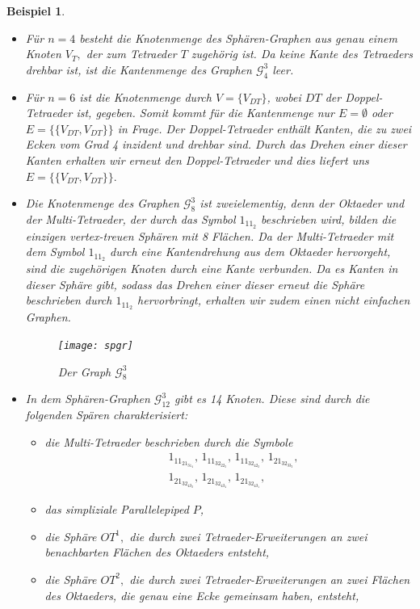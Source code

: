 \documentclass[12pt,titlepage,twoside,cleardoublepage]{article}
\theoremstyle{nummermitklammern}
\newtheorem{bsp}[temp]{Beispiel}
\newtheorem{bsp}[zahl]{Beispiel}
\numberwithin{equation}{section}
\begin{document}
 \begin{bsp}
 \begin{itemize}
 \item Für $n=4$ besteht die Knotenmenge des Sphären-Graphen aus genau einem Knoten $V_T,$ der zum Tetraeder $T$ zugehörig ist. Da keine Kante des Tetraeders drehbar ist, ist die Kantenmenge des Graphen $\mathcal{G}_4^3$ leer. 
 \item Für $n=6$ ist die Knotenmenge durch $V=\{V_{DT}\}$, wobei $DT$ der Doppel-Tetraeder ist, gegeben. Somit kommt für die Kantenmenge nur $E=\emptyset$ oder $E=\{\{V_{DT},V_{DT}\}\}$ in Frage. Der Doppel-Tetraeder enthält Kanten, die zu zwei Ecken vom Grad 4 inzident und drehbar sind. Durch das Drehen einer dieser Kanten erhalten wir erneut den Doppel-Tetraeder und dies liefert uns $E=\{\{V_{DT},V_{DT}\}\}.$ 
 \item Die Knotenmenge des Graphen $\mathcal{G}^3_8$ ist zweielementig, denn  der Oktaeder und der Multi-Tetraeder, der durch das Symbol $1_11_2$ beschrieben wird, bilden die einzigen vertex-treuen Sphären mit 8 Flächen.
 Da der Multi-Tetraeder mit dem Symbol $1_11_2$ durch eine Kantendrehung aus dem Oktaeder hervorgeht, sind die zugehörigen Knoten durch eine Kante verbunden. Da es Kanten in dieser Sphäre gibt, sodass das Drehen einer dieser erneut die Sphäre beschrieben durch $1_11_2$ hervorbringt, erhalten wir zudem einen nicht einfachen Graphen.
 \begin{figure}[H]
\begin{center}
\texttt{[image: spgr]}
\end{center}
\caption{Der Graph $\mathcal{G}_8^3$}
\end{figure}
 \item In dem Sphären-Graphen $\mathcal{G}_{12}^3$ gibt es 14 Knoten. Diese sind durch die folgenden Spären charakterisiert: 
 \begin{itemize}
 \item die Multi-Tetraeder beschrieben durch die Symbole \begin{align*}
&1_11_21_31_4,\,1_11_32_22_3,\,1_11_32_42_2,\,1_21_32_33_2,\\
&1_21_32_43_2,\,1_21_32_43_4,\,1_21_32_43_1,
\end{align*}
\item das simpliziale Parallelepiped $P$,
 \item die Sphäre $OT^1,$ die durch zwei Tetraeder-Erweiterungen an zwei benachbarten Flächen des Oktaeders entsteht,
 \item die Sphäre $OT^2,$ die durch zwei Tetraeder-Erweiterungen an zwei Flächen des Oktaeders, die genau eine Ecke gemeinsam haben, entsteht,

\end{itemize}
\end{itemize}
\end{bsp}
\end{document}
